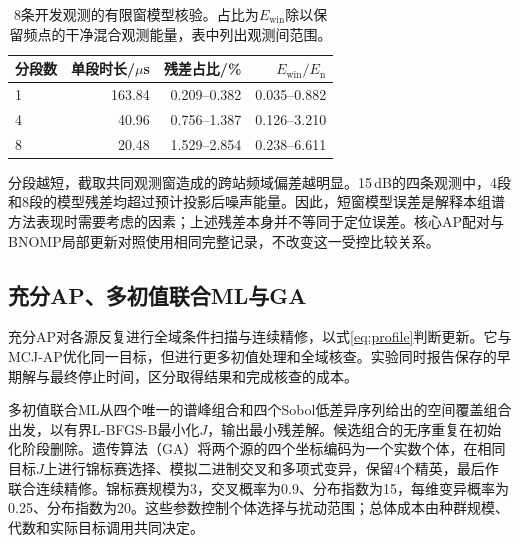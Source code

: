\documentclass[a4paper,fleqn]{cas-sc}
\numberwithin{equation}{section}
\numberwithin{figure}{section}
\numberwithin{table}{section}
\begin{document}
\begin{table}[pos=H]\centering\small
\caption{8条开发观测的有限窗模型核验。占比为$E_{\mathrm{win}}$除以保留频点的干净混合观测能量，表中列出观测间范围。}\label{tab:windowdiagnostic}
\begin{tabular}{@{}lrrr@{}}\toprule
分段数 & 单段时长/$\mu$s & 残差占比/\% & $E_{\mathrm{win}}/E_{\mathrm n}$\\\midrule
1 & 163.84 & 0.209--0.382 & 0.035--0.882\\
4 & 40.96 & 0.756--1.387 & 0.126--3.210\\
8 & 20.48 & 1.529--2.854 & 0.238--6.611\\\bottomrule
\end{tabular}\end{table}
分段越短，截取共同观测窗造成的跨站频域偏差越明显。15\,dB的四条观测中，4段和8段的模型残差均超过预计投影后噪声能量。因此，短窗模型误差是解释本组谱方法表现时需要考虑的因素；上述残差本身并不等同于定位误差。核心AP配对与BNOMP局部更新对照使用相同完整记录，不改变这一受控比较关系。

\subsection{充分AP、多初值联合ML与GA}
充分AP对各源反复进行全域条件扫描与连续精修，以式\eqref{eq:profile}判断更新\cite{ChenHudsonYao2002}。它与MCJ-AP优化同一目标，但进行更多初值处理和全域核查。实验同时报告保存的早期解与最终停止时间，区分取得结果和完成核查的成本。

多初值联合ML从四个唯一的谱峰组合和四个Sobol低差异序列给出的空间覆盖组合出发，以有界L-BFGS-B最小化$J$，输出最小残差解。候选组合的无序重复在初始化阶段删除。遗传算法（GA）将两个源的四个坐标编码为一个实数个体，在相同目标$J$上进行锦标赛选择、模拟二进制交叉和多项式变异\cite{DebAgrawal1995}，保留4个精英，最后作联合连续精修。锦标赛规模为3，交叉概率为0.9、分布指数为15，每维变异概率为0.25、分布指数为20。这些参数控制个体选择与扰动范围；总体成本由种群规模、代数和实际目标调用共同决定。
\end{document}

